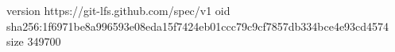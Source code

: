 version https://git-lfs.github.com/spec/v1
oid sha256:1f6971be8a996593e08eda15f7424eb01ccc79c9cf7857db334bce4e93cd4574
size 349700
